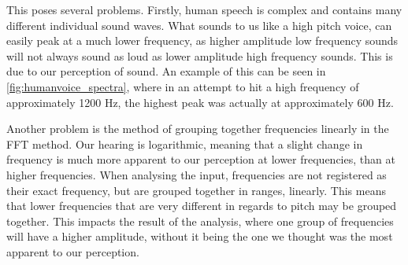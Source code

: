 This poses several problems.
Firstly, human speech is complex and contains many different individual sound waves.
What sounds to us like a high pitch voice, can easily peak at a much lower frequency, as higher amplitude low frequency sounds will not always sound as loud as lower amplitude high frequency sounds.
This is due to our perception of sound.
An example of this can be seen in \cref{fig:humanvoice_spectra}, where in an attempt to hit a high frequency of approximately 1200 Hz, the highest peak was actually at approximately 600 Hz.

Another problem is the method of grouping together frequencies linearly in the FFT method.
Our hearing is logarithmic, meaning that a slight change in frequency is much more apparent to our perception at lower frequencies, than at higher frequencies.
When analysing the input, frequencies are not registered as their exact frequency, but are grouped together in ranges, linearly.
This means that lower frequencies that are very different in regards to pitch may be grouped together.
This impacts the result of the analysis, where one group of frequencies will have a higher amplitude, without it being the one we thought was the most apparent to our perception.
